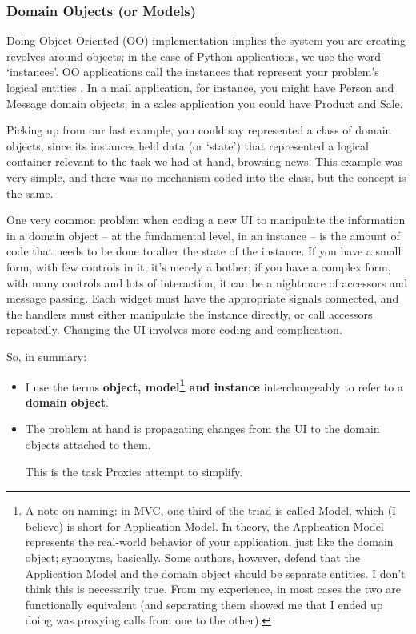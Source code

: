 \documentclass[a4paper]{howto}
\begin{document}
\subsubsection{Domain Objects (or Models)}

Doing Object Oriented (OO) implementation implies the system you are
creating revolves around objects; in the case of Python applications, we
use the word `instances'. OO applications call the instances that
represent your problem's logical entities
. In a
mail application, for instance, you might have Person and Message domain
objects; in a sales application you could have Product and Sale.

Picking up from our last example, you could say 
represented a class of domain objects, since its instances held data (or
`state') that represented a logical container relevant to the task we
had at hand, browsing news.  This example was very simple, and there was
no mechanism coded into the  class, but the concept is
the same.

One very common problem when coding a new UI to manipulate the
information in a domain object -- at the fundamental level, in an
instance -- is the amount of code that needs to be done to alter the
state of the instance. If you have a small form, with few controls in
it, it's merely a bother; if you have a complex form, with many controls
and lots of interaction, it can be a nightmare of accessors and message
passing. Each widget must have the appropriate signals connected, and
the handlers must either manipulate the instance directly, or call
accessors repeatedly. Changing the UI involves more coding and
complication.

So, in summary:

\begin{itemize}
\item I use the terms {\bf object, model\footnote{A note on naming: in
MVC, one third of the triad is called Model, which (I believe) is short
for Application Model. In theory, the Application Model represents the
real-world behavior of your application, just like the domain object;
synonyms, basically. Some authors, however, defend that the Application
Model and the domain object should be separate entities. I don't think
this is necessarily true.  From my experience, in most cases the two are
functionally equivalent (and separating them showed me that I ended up
doing was proxying calls from one to the other).} and instance}
interchangeably to refer to a {\bf domain object}.
\item The problem at hand is propagating changes from the UI to the
domain objects attached to them.

This is the task Proxies attempt to simplify.
\end{itemize}
\end{document}
